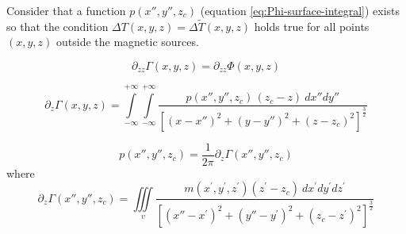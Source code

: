 Consider that a function $p(x'', y'', z_{c})$ (equation \ref{eq:Phi-surface-integral}) 
exists so that the condition
$\Delta T(x, y, z) = \Delta \tilde{T}(x, y, z)$ holds true for all points $(x, y, z)$
outside the magnetic sources. 

\begin{equation}
	\partial_{zz} \Gamma(x, y, z) = \partial_{zz} \Phi(x, y, z)
	\label{eq:equality-partial-derivatives-zz}
\end{equation}

\begin{equation}
	\partial_{z} \Gamma(x, y, z) = \int\limits_{-\infty}^{+\infty}\int\limits_{-\infty}^{+\infty}
	\frac{p(x'', y'', z_{c}) \, (z_{c} - z) \: dx'' dy''}
	{\left[ (x-x'')^2 + (y-y'')^2 + (z-z_{c})^2 \right]^{\frac{3}{2}}}
	\label{eq:DzPhi-surface-integral}
\end{equation}

\begin{equation}
	p(x'', y'', z_{c}) = \frac{1}{2\pi} \partial_{z} \Gamma(x'', y'', z_{c})
	\label{eq:function-p}
\end{equation}
where
\begin{equation}
	\partial_{z} \Gamma(x'', y'', z_{c}) = \iiint\limits_{\upsilon} 
	\frac{m(x^{\prime}, y^{\prime}, z^{\prime}) (z^{\prime} - z_{c}) \: dx^{\prime} dy^{\prime} dz^{\prime}}
	{\left[ (x''-x^{\prime})^2 + (y''-y^{\prime})^2 + (z_{c}-z^{\prime})^2 \right]^{\frac{3}{2}}}
	\label{eq:DzGamma-volume-integral}
\end{equation}

